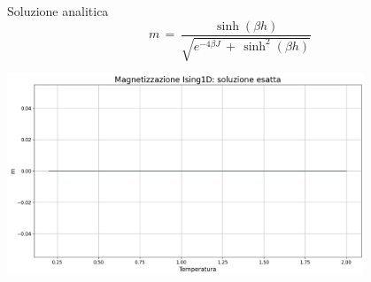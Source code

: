 \begin{frame}
\begin{columns}
\begin{column}{0.5\textwidth}
\begin{block}{Soluzione analitica}
			    \begin{equation*}
			    	m\,=\,\frac{\sinh{\left(\beta h\right)}}{\sqrt{e^{-4\beta J}\,+\,\sinh^2{\left(\beta h\right)}}}
			    	\label{eq: magn_Ising1D_AS}
			    \end{equation*}

			    \vspace{0.1cm}

                \centering
				\includegraphics[width=0.8\textwidth]{Immagini/Introduzione/magn_Ising1D_sa.png}
            
            \end{block}
        \end{column}
      \end{columns}
  
\end{frame}



